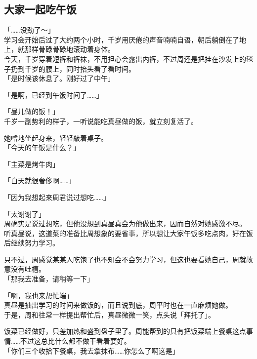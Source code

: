\subsection{大家一起吃午饭}

「……没劲了～」\\

学习会开始后过了大约两个小时，千岁用厌倦的声音喃喃自语，朝后躺倒在了地上，就那样骨碌骨碌地滚动着身体。\\

今天，千岁穿着短裤和裤袜，不用担心会露出内裤，不过周还是把挂在沙发上的毯子扔到千岁的腰上，同时抬头看了看时间。\\

「是时候该休息了。刚好过了中午」

「是啊，已经到午饭时间了……」

「昼儿做的饭！」\\

千岁一副势利的样子，一听说能吃真昼做的饭，就立刻复活了。

她噌地坐起身来，轻轻敲着桌子。\\

「今天的午饭是什么？」

「主菜是烤牛肉」

「白天就很奢侈啊……」

「因为我想起来周君说过想吃……」

「太谢谢了」\\

周确实是说过想吃，但他没想到真昼真会为他做出来，因而自然对她感激不尽。\\

听真昼说，这道菜的准备比周想象的要省事，所以想让大家午饭多吃点肉，好在饭后继续努力学习。

只不过，周感觉某某人吃饱了也不知会不会努力学习，但这也要看她自己，周就故意没有吐槽。\\

「那我去准备，请稍等一下」

「啊，我也来帮忙端」\\

真昼是抽出学习的时间来做饭的，而且说到底，周平时也在一直麻烦她做。\\

于是，周和往常一样提出帮忙后，真昼微微一笑，点头说「拜托了」。

饭菜已经做好，只差加热和盛到盘子里了。周能帮到的只有把饭菜端上餐桌这点事情……不过这总比什么都不做干看着要好。\\

「你们三个收拾下餐桌，我去拿抹布……你怎么了啊这是」

